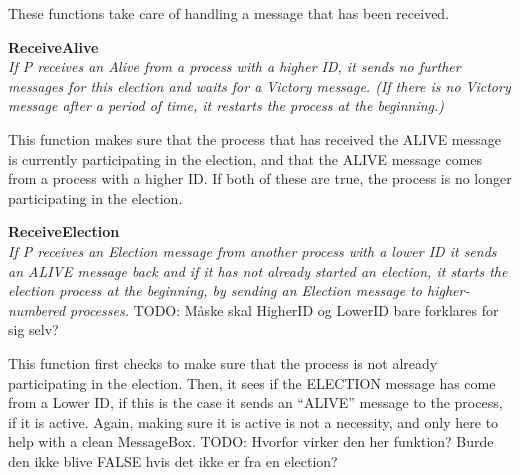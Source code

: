\documentclass{report}
\begin{document}
\noindent{}

These functions take care of handling a message that has been received.

\textbf{ReceiveAlive}\\
\textit{If P receives an Alive from a process with a higher ID, it sends no further messages for this election and waits for a Victory message. (If there is no Victory message after a period of time, it restarts the process at the beginning.)}

This function makes sure that the process that has received the ALIVE message is currently participating in the election, and that the ALIVE message comes from a process with a higher ID. If both of these are true, the process is no longer participating in the election.

\textbf{ReceiveElection}\\
\textit{If P receives an Election message from another process with a lower ID it sends an ALIVE message back and if it has not already started an election, it starts the election process at the beginning, by sending an Election message to higher-numbered processes.}
TODO: Måske skal HigherID og LowerID bare forklares for sig selv?

This function first checks to make sure that the process is not already participating in the election. Then, it sees if the ELECTION message has come from a Lower ID, if this is the case it sends an ``ALIVE'' message to the process, if it is active. Again, making sure it is active is not a necessity, and only here to help with a clean MessageBox.
TODO: Hvorfor virker den her funktion? Burde den ikke blive FALSE hvis det ikke er fra en election?
\end{document}
